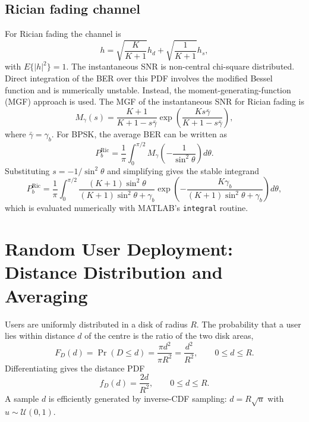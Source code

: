 \documentclass[12pt,a4paper]{article}
\begin{document}
\subsection{Rician fading channel}
For Rician fading the channel is
\begin{equation}
    h=\sqrt{\frac{K}{K+1}}h_d+\sqrt{\frac{1}{K+1}}h_s,
\end{equation}
with $E\{|h|^2\}=1$. The instantaneous SNR is non-central chi-square distributed. Direct integration of the BER over this PDF involves the modified Bessel function and is numerically unstable. Instead, the moment-generating-function (MGF) approach is used. The MGF of the instantaneous SNR for Rician fading is
\begin{equation}
    M_{\gamma}(s)=\frac{K+1}{K+1-s\bar{\gamma}}\exp\!\left(\frac{K s\bar{\gamma}}{K+1-s\bar{\gamma}}\right),
\end{equation}
where $\bar{\gamma}=\gamma_b$. For BPSK, the average BER can be written as
\begin{equation}
    P_b^{\text{Ric}}=\frac{1}{\pi}\int_0^{\pi/2}M_{\gamma}\!\left(-\frac{1}{\sin^2\theta}\right)d\theta.
\end{equation}
Substituting $s=-1/\sin^2\theta$ and simplifying gives the stable integrand
\begin{equation}
    P_b^{\text{Ric}}=\frac{1}{\pi}\int_0^{\pi/2}
    \frac{(K+1)\sin^2\theta}{(K+1)\sin^2\theta+\gamma_b}
    \exp\!\left(-\frac{K\gamma_b}{(K+1)\sin^2\theta+\gamma_b}\right)d\theta,
\end{equation}
which is evaluated numerically with MATLAB's \texttt{integral} routine.

\section{Random User Deployment: Distance Distribution and Averaging}\label{app:random}
Users are uniformly distributed in a disk of radius $R$. The probability that a user lies within distance $d$ of the centre is the ratio of the two disk areas,
\begin{equation}
    F_D(d)=\Pr(D\le d)=\frac{\pi d^2}{\pi R^2}=\frac{d^2}{R^2},\qquad 0\le d\le R.
\end{equation}
Differentiating gives the distance PDF
\begin{equation}
    f_D(d)=\frac{2d}{R^2},\qquad 0\le d\le R.
\end{equation}
A sample $d$ is efficiently generated by inverse-CDF sampling: $d=R\sqrt{u}$ with $u\sim\mathcal{U}(0,1)$.
\end{document}
